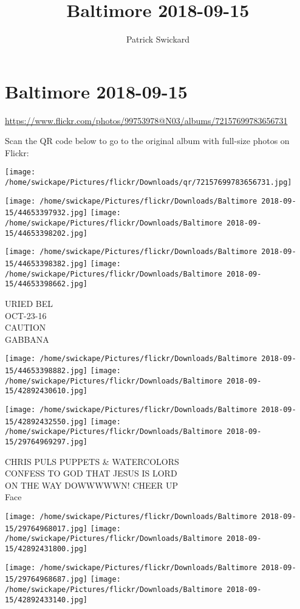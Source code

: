 \documentclass[10pt,letterpaper]{article}
\title{Baltimore 2018-09-15}
\author{Patrick Swickard}
\date{}
\begin{document}
\section*{Baltimore 2018-09-15}

\url{https://www.flickr.com/photos/99753978@N03/albums/72157699783656731}

Scan the QR code below to go to the original album with full-size photos on Flickr:

\texttt{[image: /home/swickape/Pictures/flickr/Downloads/qr/72157699783656731.jpg]}
\pagebreak

\texttt{[image: /home/swickape/Pictures/flickr/Downloads/Baltimore 2018-09-15/44653397932.jpg]}
\texttt{[image: /home/swickape/Pictures/flickr/Downloads/Baltimore 2018-09-15/44653398202.jpg]}

\texttt{[image: /home/swickape/Pictures/flickr/Downloads/Baltimore 2018-09-15/44653398382.jpg]}
\texttt{[image: /home/swickape/Pictures/flickr/Downloads/Baltimore 2018-09-15/44653398662.jpg]}

URIED BEL\\
OCT{-}23{-}16\\
CAUTION\\
GABBANA
\pagebreak

\texttt{[image: /home/swickape/Pictures/flickr/Downloads/Baltimore 2018-09-15/44653398882.jpg]}
\texttt{[image: /home/swickape/Pictures/flickr/Downloads/Baltimore 2018-09-15/42892430610.jpg]}

\texttt{[image: /home/swickape/Pictures/flickr/Downloads/Baltimore 2018-09-15/42892432550.jpg]}
\texttt{[image: /home/swickape/Pictures/flickr/Downloads/Baltimore 2018-09-15/29764969297.jpg]}

CHRIS PULS PUPPETS \& WATERCOLORS\\
CONFESS TO GOD THAT JESUS IS LORD\\
ON THE WAY DOWWWWWN!  CHEER UP\\
Face
\pagebreak

\texttt{[image: /home/swickape/Pictures/flickr/Downloads/Baltimore 2018-09-15/29764968017.jpg]}
\texttt{[image: /home/swickape/Pictures/flickr/Downloads/Baltimore 2018-09-15/42892431800.jpg]}

\texttt{[image: /home/swickape/Pictures/flickr/Downloads/Baltimore 2018-09-15/29764968687.jpg]}
\texttt{[image: /home/swickape/Pictures/flickr/Downloads/Baltimore 2018-09-15/42892433140.jpg]}
\end{document}
